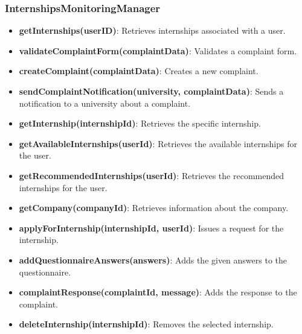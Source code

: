 \subsubsection{InternshipsMonitoringManager}
\begin{itemize}
    \item \textbf{getInternships(userID)}: Retrieves internships associated with a user.
    \item \textbf{validateComplaintForm(complaintData)}: Validates a complaint form.
    \item \textbf{createComplaint(complaintData)}: Creates a new complaint.
    \item \textbf{sendComplaintNotification(university, complaintData)}: Sends a notification to a university about a complaint.
    \item \textbf{getInternship(internshipId)}: Retrieves the specific internship.
    \item \textbf{getAvailableInternships(userId)}: Retrieves the available internships for the user.
    \item \textbf{getRecommendedInternships(userId)}: Retrieves the recommended internships for the user.
    \item \textbf{getCompany(companyId)}: Retrieves information about the company.
    \item \textbf{applyForInternship(internshipId, userId)}: Issues a request for the internship.
    \item \textbf{addQuestionnaireAnswers(answers)}: Adds the given answers to the questionnaire.
    \item \textbf{complaintResponse(complaintId, message)}: Adds the response to the complaint.
    \item \textbf{deleteInternship(internshipId)}: Removes the selected internship.
\end{itemize}

